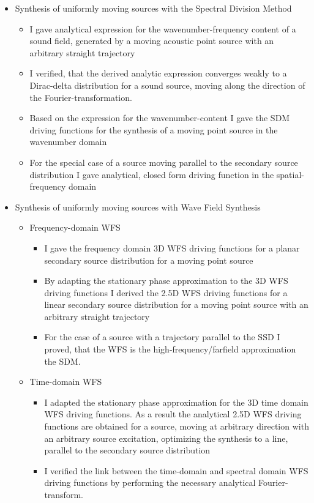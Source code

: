\documentclass[a4paper,10pt]{article}
\begin{document}
\begin{itemize}
\item Synthesis of uniformly moving sources with the Spectral Division Method
	\begin{itemize}
	\item I gave analytical expression for the wavenumber-frequency content of a sound field, generated by a moving acoustic point source with an arbitrary straight trajectory
	\item I verified, that the derived analytic expression converges weakly to a Dirac-delta distribution for a sound source, moving along the direction of the Fourier-transformation.
	\item Based on the expression for the wavenumber-content I gave the SDM driving functions for the synthesis of a moving point source in the wavenumber domain
	\item For the special case of a source moving parallel to the secondary source distribution I gave analytical, closed form driving function in the spatial-frequency domain
	\end{itemize}
\item Synthesis of uniformly moving sources with Wave Field Synthesis
	\begin{itemize}
	\item Frequency-domain WFS
		\begin{itemize}
		\item I gave the frequency domain 3D WFS driving functions for a planar secondary source distribution for a moving point source
		\item By adapting the stationary phase approximation to the 3D WFS driving functions I derived the 2.5D WFS driving functions for a linear secondary source distribution for a moving point source with an arbitrary straight trajectory
		\item For the case of a source with a trajectory parallel to the SSD I proved, that the WFS is the high-frequency/farfield approximation the SDM.
		\end{itemize}
	\item Time-domain WFS
		\begin{itemize}
		\item I adapted the stationary phase approximation for the 3D time domain WFS driving functions. As a result the analytical 2.5D WFS driving functions are obtained for a source, 	moving at arbitrary direction with an arbitrary source excitation, optimizing the synthesis to a line, parallel to the secondary source distribution
		\item I verified the link between the time-domain and spectral domain WFS driving functions by performing the necessary analytical Fourier-transform.
		\end{itemize}
	\end{itemize}
\end{itemize}
\end{document}

